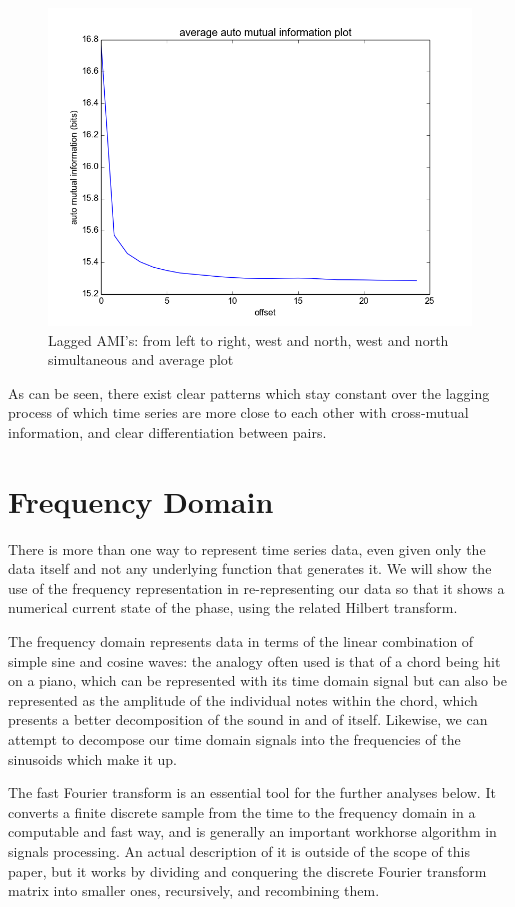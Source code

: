 \documentclass[12pt]{article}
\begin{document}
\begin{figure}
  \includegraphics[scale=0.4]{norths_ami_summary}
  \caption{Lagged AMI's: from left to right, west and north, west and north simultaneous and average plot}
  \label{fig:lag_ami}
\end{figure}

As can be seen, there exist clear patterns which stay constant over the lagging process of which time series are more close to each other with cross-mutual information, and clear differentiation between pairs.

\section{Frequency Domain}

There is more than one way to represent time series data, even given only the data itself and not any underlying function that generates it. We will show the use of the frequency representation in re-representing our data so that it shows a numerical current state of the phase, using the related Hilbert transform.

The frequency domain represents data in terms of the linear combination of simple sine and cosine waves: the analogy often used is that of a chord being hit on a piano, which can be represented with its time domain signal but can also be represented as the amplitude of the individual notes within the chord, which presents a better decomposition of the sound in and of itself. Likewise, we can attempt to decompose our time domain signals into the frequencies of the sinusoids which make it up.

The fast Fourier transform\cite{fft} is an essential tool for the further analyses below. It converts a finite discrete sample from the time to the frequency domain in a computable and fast way, and is generally an important workhorse algorithm in signals processing. An actual description of it is outside of the scope of this paper, but it works by dividing and conquering the discrete Fourier transform matrix into smaller ones, recursively, and recombining them.
\end{document}
